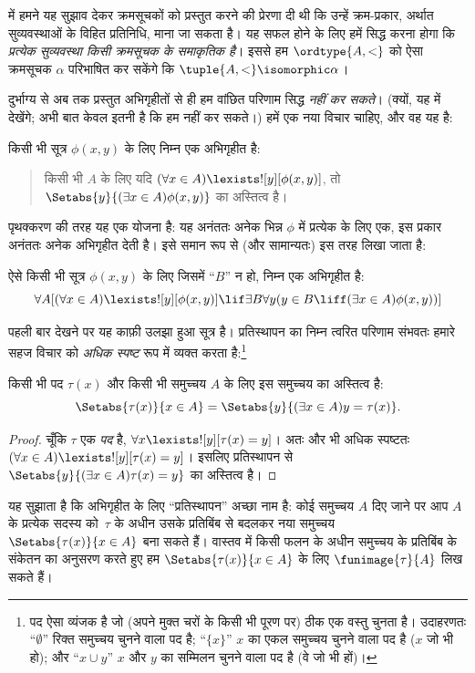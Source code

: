 \documentclass[../../../include/open-logic-section]{subfiles}
\begin{document}

 में हमने यह सुझाव देकर क्रमसूचकों को प्रस्तुत
करने की प्रेरणा दी थी कि उन्हें क्रम-प्रकार, अर्थात सुव्यवस्थाओं के विहित
प्रतिनिधि, माना जा सकता है। यह सफल होने के लिए हमें सिद्ध करना होगा कि
\emph{प्रत्येक सुव्यवस्था किसी क्रमसूचक के समाकृतिक है}। इससे हम
$\ordtype{A, <}$ को ऐसा क्रमसूचक $\alpha$ परिभाषित कर सकेंगे कि
$\tuple{A, <} \isomorphic \alpha$।

दुर्भाग्य से अब तक प्रस्तुत अभिगृहीतों से ही हम वांछित परिणाम सिद्ध
\emph{नहीं कर सकते}। (क्यों, यह  में
देखेंगे; अभी बात केवल इतनी है कि हम नहीं कर सकते।) हमें एक नया विचार चाहिए,
और वह यह है:

\begin{axiom}[प्रतिस्थापन की योजना]
किसी भी सूत्र $\phi(x, y)$ के लिए निम्न एक अभिगृहीत है:
\begin{quote}
	किसी भी $A$ के लिए यदि $(\forall x \in A)\lexists![y][\phi(x,y)]$,
	तो $\Setabs{y}{(\exists x \in A)\phi(x,y)}$ का अस्तित्व है।
\end{quote}
\end{axiom}
\noindent
पृथक्करण की तरह यह एक योजना है: यह अनंततः अनेक भिन्न $\phi$ में प्रत्येक
के लिए एक, इस प्रकार अनंततः अनेक अभिगृहीत देती है। इसे समान रूप से (और
सामान्यतः) इस तरह लिखा जाता है:

\begin{defish}
ऐसे किसी भी सूत्र $\phi(x,y)$ के लिए जिसमें ``$B$'' न हो, निम्न एक
अभिगृहीत है:
\[
\forall A[(\forall x \in A)\lexists![y][\phi(x,y)] \lif \exists B\forall y (y \in B \liff (\exists x \in A)\phi(x,y))]
\]
\end{defish}

पहली बार देखने पर यह काफ़ी उलझा हुआ सूत्र है। प्रतिस्थापन का निम्न त्वरित
परिणाम संभवतः हमारे सहज विचार को \emph{अधिक स्पष्ट} रूप में व्यक्त करता
है:\footnote{पद ऐसा व्यंजक है जो (अपने मुक्त चरों के किसी भी पूरण पर) ठीक
एक वस्तु चुनता है। उदाहरणतः ``$\emptyset$'' रिक्त समुच्चय चुनने वाला पद है;
``$\{x\}$'' $x$ का एकल समुच्चय चुनने वाला पद है ($x$ जो भी हो); और
``$x \cup y$'' $x$ और $y$ का सम्मिलन चुनने वाला पद है (वे जो भी हों)।}

\begin{cor}
किसी भी पद $\tau(x)$ और किसी भी समुच्चय $A$ के लिए इस समुच्चय का अस्तित्व है:
\[
	\Setabs{\tau(x)}{x \in A} = \Setabs{y}{(\exists x \in A)y = \tau(x)}.
\]
\end{cor}

\begin{proof}
चूँकि $\tau$ एक \emph{पद} है,
$\forall x \lexists![y][\tau(x) = y]$। अतः और भी अधिक स्पष्टतः
$(\forall x \in A)\lexists![y][\tau(x) = y]$। इसलिए प्रतिस्थापन से
$\Setabs{y}{(\exists x \in A)\tau(x) = y}$ का अस्तित्व है।
\end{proof}
\noindent
यह सुझाता है कि अभिगृहीत के लिए ``प्रतिस्थापन'' अच्छा नाम है: कोई समुच्चय
$A$ दिए जाने पर आप $A$ के प्रत्येक सदस्य को~$\tau$ के अधीन उसके प्रतिबिंब
से बदलकर नया समुच्चय $\Setabs{\tau(x)}{x \in A}$ बना सकते हैं। वास्तव में
किसी फलन के अधीन समुच्चय के प्रतिबिंब के संकेतन का अनुसरण करते हुए हम
$\Setabs{\tau(x)}{x \in A}$ के लिए $\funimage{\tau}{A}$ लिख सकते हैं।
\end{document}
